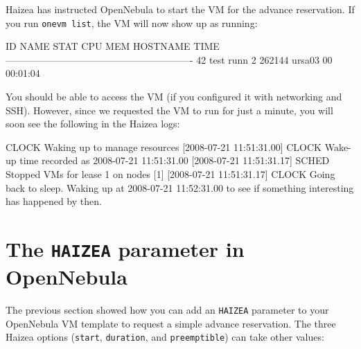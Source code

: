 Haizea has instructed OpenNebula to start the VM for the advance reservation. If you run \texttt{onevm list}, the VM will now show up as running:

\begin{wideshellverbatim}
  ID     NAME STAT CPU     MEM        HOSTNAME        TIME
----------------------------------------------------------
  42     test runn   2  262144          ursa03 00 00:01:04
\end{wideshellverbatim}

You should be able to access the VM (if you configured it with networking and SSH). However, since we requested the VM to run for just a minute, you will soon see the following in the Haizea logs:

\begin{wideshellverbatim}
[2008-07-21 11:51:31.00] CLOCK   Waking up to manage resources
[2008-07-21 11:51:31.00] CLOCK   Wake-up time recorded as 2008-07-21 11:51:31.00
[2008-07-21 11:51:31.17] SCHED   Stopped VMs for lease 1 on nodes [1]
[2008-07-21 11:51:31.17] CLOCK   Going back to sleep. 
                                 Waking up at 2008-07-21 11:52:31.00 
                                 to see if something interesting has happened by then.
\end{wideshellverbatim}

\section{The \texttt{HAIZEA} parameter in OpenNebula}

The previous section showed how you can add an \texttt{HAIZEA} parameter to your OpenNebula VM template to request a simple advance reservation. The three Haizea options (\texttt{start}, \texttt{duration}, and \texttt{preemptible}) can take other values:

